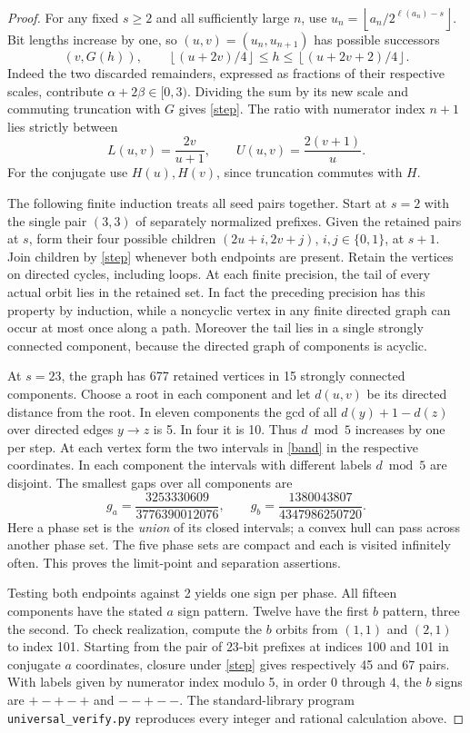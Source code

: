 \documentclass[11pt,letterpaper]{article}
\newcommand{\fl}[1]{\left\lfloor#1\right\rfloor}
\begin{document}
\begin{proof}
For any fixed $s\ge2$ and all sufficiently large $n$, use $u_n=\fl{a_n/2^{\ell(a_n)-s}}$. Bit lengths increase by one, so $(u,v)=(u_n,u_{n+1})$ has possible successors
\begin{equation}
 (v,G(h)),\qquad \fl{(u+2v)/4}\le h\le\fl{(u+2v+2)/4}.
 \label{step}
\end{equation}
Indeed the two discarded remainders, expressed as fractions of their respective scales, contribute $\alpha+2\beta\in[0,3)$. Dividing the sum by its new scale and commuting truncation with $G$ gives \eqref{step}. The ratio with numerator index $n+1$ lies strictly between
\begin{equation}
 L(u,v)=\frac{2v}{u+1},\qquad U(u,v)=\frac{2(v+1)}u.\label{band}
\end{equation}
For the conjugate use $H(u),H(v)$, since truncation commutes with $H$.

The following finite induction treats all seed pairs together. Start at $s=2$ with the single pair $(3,3)$ of separately normalized prefixes. Given the retained pairs at $s$, form their four possible children $(2u+i,2v+j)$, $i,j\in\{0,1\}$, at $s+1$. Join children by \eqref{step} whenever both endpoints are present. Retain the vertices on directed cycles, including loops. At each finite precision, the tail of every actual orbit lies in the retained set. In fact the preceding precision has this property by induction, while a noncyclic vertex in any finite directed graph can occur at most once along a path. Moreover the tail lies in a single strongly connected component, because the directed graph of components is acyclic.

At $s=23$, the graph has 677 retained vertices in 15 strongly connected components. Choose a root in each component and let $d(u,v)$ be its directed distance from the root. In eleven components the gcd of all $d(y)+1-d(z)$ over directed edges $y\to z$ is 5. In four it is 10. Thus $d\bmod5$ increases by one per step. At each vertex form the two intervals in \eqref{band} in the respective coordinates. In each component the intervals with different labels $d\bmod5$ are disjoint. The smallest gaps over all components are
\[
 g_a=\frac{3253330609}{3776390012076},\qquad
 g_b=\frac{1380043807}{4347986250720}.
\]
Here a phase set is the \emph{union} of its closed intervals; a convex hull can pass across another phase set. The five phase sets are compact and each is visited infinitely often. This proves the limit-point and separation assertions.

Testing both endpoints against 2 yields one sign per phase. All fifteen components have the stated $a$ sign pattern. Twelve have the first $b$ pattern, three the second. To check realization, compute the $b$ orbits from $(1,1)$ and $(2,1)$ to index 101. Starting from the pair of $23$-bit prefixes at indices 100 and 101 in conjugate $a$ coordinates, closure under \eqref{step} gives respectively 45 and 67 pairs. With labels given by numerator index modulo 5, in order $0$ through $4$, the $b$ signs are $+-+-+$ and $--+--$. The standard-library program \texttt{universal\_verify.py} reproduces every integer and rational calculation above.
\end{proof}
\end{document}
